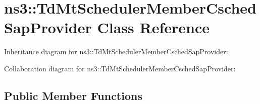 \hypertarget{classns3_1_1TdMtSchedulerMemberCschedSapProvider}{}\section{ns3\+:\+:Td\+Mt\+Scheduler\+Member\+Csched\+Sap\+Provider Class Reference}
\label{classns3_1_1TdMtSchedulerMemberCschedSapProvider}


Inheritance diagram for ns3\+:\+:Td\+Mt\+Scheduler\+Member\+Csched\+Sap\+Provider\+:


Collaboration diagram for ns3\+:\+:Td\+Mt\+Scheduler\+Member\+Csched\+Sap\+Provider\+:
\subsection*{Public Member Functions}
